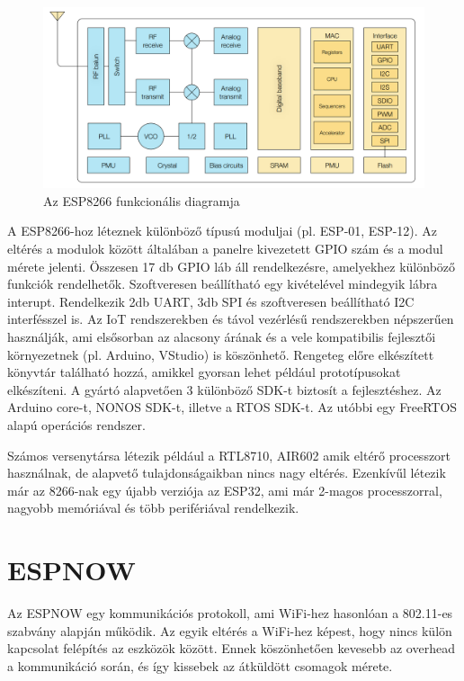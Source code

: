 \begin{figure}[!ht]
    \centering
    \includegraphics[width=150mm, keepaspectratio]{figures/esp8266funcdiag.png}
    \caption{Az ESP8266 funkcionális diagramja}
    \label{fig:TeXstudio}
\end{figure}

A ESP8266-hoz léteznek különböző típusú moduljai (pl. ESP-01, ESP-12). Az eltérés a modulok között általában a panelre kivezetett GPIO szám és a modul mérete jelenti. Összesen 17 db GPIO láb áll rendelkezésre, amelyekhez különböző funkciók rendelhetők. Szoftveresen beállítható egy kivételével mindegyik lábra interupt. Rendelkezik 2db UART, 3db SPI és szoftveresen beállítható I2C interfésszel is.
Az IoT rendszerekben és távol vezérlésű rendszerekben népszerűen használják, ami elsősorban az alacsony árának és a vele kompatibilis fejlesztői környezetnek (pl. Arduino, VStudio) is köszönhető. Rengeteg előre elkészített könyvtár található hozzá, amikkel gyorsan lehet például prototípusokat elkészíteni. A gyártó alapvetően 3 különböző SDK-t biztosít a fejlesztéshez. Az Arduino core-t, NONOS SDK-t, illetve a RTOS SDK-t. Az utóbbi egy FreeRTOS alapú operációs rendszer.

Számos versenytársa létezik például a RTL8710, AIR602 amik eltérő processzort használnak, de alapvető tulajdonságaikban nincs nagy eltérés. Ezenkívűl létezik már az 8266-nak egy újabb verziója az ESP32, ami már 2-magos processzorral, nagyobb memóriával és több perifériával rendelkezik.



\section{ESPNOW}
Az ESPNOW egy kommunikációs protokoll, ami WiFi-hez hasonlóan a 802.11-es szabvány alapján működik. Az egyik eltérés a WiFi-hez képest, hogy nincs külön kapcsolat felépítés az eszközök között. Ennek köszönhetően kevesebb az overhead a kommunikáció során, és így kissebek az átküldött csomagok mérete.

